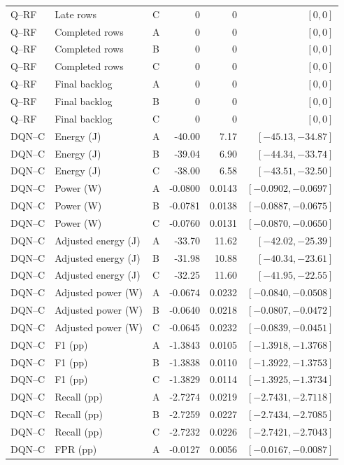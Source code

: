\begin{longtable}{lllrrr}
Q--RF & Late rows & C & 0 & 0 & $[0,0]$\\
Q--RF & Completed rows & A & 0 & 0 & $[0,0]$\\
Q--RF & Completed rows & B & 0 & 0 & $[0,0]$\\
Q--RF & Completed rows & C & 0 & 0 & $[0,0]$\\
Q--RF & Final backlog & A & 0 & 0 & $[0,0]$\\
Q--RF & Final backlog & B & 0 & 0 & $[0,0]$\\
Q--RF & Final backlog & C & 0 & 0 & $[0,0]$\\
DQN--C & Energy (J) & A & -40.00 & 7.17 & $[-45.13,-34.87]$\\
DQN--C & Energy (J) & B & -39.04 & 6.90 & $[-44.34,-33.74]$\\
DQN--C & Energy (J) & C & -38.00 & 6.58 & $[-43.51,-32.50]$\\
DQN--C & Power (W) & A & -0.0800 & 0.0143 & $[-0.0902,-0.0697]$\\
DQN--C & Power (W) & B & -0.0781 & 0.0138 & $[-0.0887,-0.0675]$\\
DQN--C & Power (W) & C & -0.0760 & 0.0131 & $[-0.0870,-0.0650]$\\
DQN--C & Adjusted energy (J) & A & -33.70 & 11.62 & $[-42.02,-25.39]$\\
DQN--C & Adjusted energy (J) & B & -31.98 & 10.88 & $[-40.34,-23.61]$\\
DQN--C & Adjusted energy (J) & C & -32.25 & 11.60 & $[-41.95,-22.55]$\\
DQN--C & Adjusted power (W) & A & -0.0674 & 0.0232 & $[-0.0840,-0.0508]$\\
DQN--C & Adjusted power (W) & B & -0.0640 & 0.0218 & $[-0.0807,-0.0472]$\\
DQN--C & Adjusted power (W) & C & -0.0645 & 0.0232 & $[-0.0839,-0.0451]$\\
DQN--C & F1 (pp) & A & -1.3843 & 0.0105 & $[-1.3918,-1.3768]$\\
DQN--C & F1 (pp) & B & -1.3838 & 0.0110 & $[-1.3922,-1.3753]$\\
DQN--C & F1 (pp) & C & -1.3829 & 0.0114 & $[-1.3925,-1.3734]$\\
DQN--C & Recall (pp) & A & -2.7274 & 0.0219 & $[-2.7431,-2.7118]$\\
DQN--C & Recall (pp) & B & -2.7259 & 0.0227 & $[-2.7434,-2.7085]$\\
DQN--C & Recall (pp) & C & -2.7232 & 0.0226 & $[-2.7421,-2.7043]$\\
DQN--C & FPR (pp) & A & -0.0127 & 0.0056 & $[-0.0167,-0.0087]$\\

\end{longtable}
